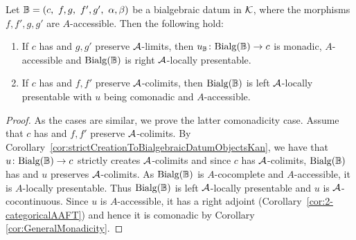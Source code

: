 \begin{theorem}\label{thm:2CatLPComonadicity}
    Let $\mathbb{B} = (c,\ f,g,\ f',g',\ \alpha,\beta)$ be a bialgebraic datum in $\mathcal{K}$, where the morphisms $f,f',g,g'$ are $A$-accessible. Then the following hold:
    \begin{enumerate}
        \item If $c$ has and $g,g'$ preserve $\mathcal{A}$-limits, then $u_{\mathbb{B}}\colon \mathrm{Bialg}(\mathbb{B})\to c$ is monadic, $A$-accessible and $\mathrm{Bialg}(\mathbb{B})$ is right $\mathcal{A}$-locally presentable.
        \item If $c$ has and $f,f'$ preserve $\mathcal{A}$-colimits, then $\mathrm{Bialg}(\mathbb{B})$ is left $\mathcal{A}$-locally presentable with $u$ being comonadic and $A$-accessible.
    \end{enumerate}
\end{theorem}
\begin{proof}
    As the cases are similar, we prove the latter comonadicity case. Assume that $c$ has and $f,f'$ preserve $\mathcal{A}$-colimits. By Corollary~\ref{cor:strictCreationToBialgebraicDatumObjectsKan}, we have that  $u\colon \mathrm{Bialg}(\mathbb{B})\to c$ strictly creates $\mathcal{A}$-colimits and since $c$ has $\mathcal{A}$-colimits, $\mathrm{Bialg}(\mathbb{B})$ has and $u$ preserves $\mathcal{A}$-colimits. As $\mathrm{Bialg}(\mathbb{B})$ is $A$-cocomplete and $A$-accessible, it is $A$-locally presentable. Thus $\mathrm{Bialg}(\mathbb{B})$ is left $\mathcal{A}$-locally presentable and $u$ is $\mathcal{A}$-cocontinuous. Since $u$ is $A$-accessible, it has a right adjoint (Corollary~\ref{cor:2-categoricalAAFT}) and hence it is comonadic by Corollary \ref{cor:GeneralMonadicity}.
\end{proof}

